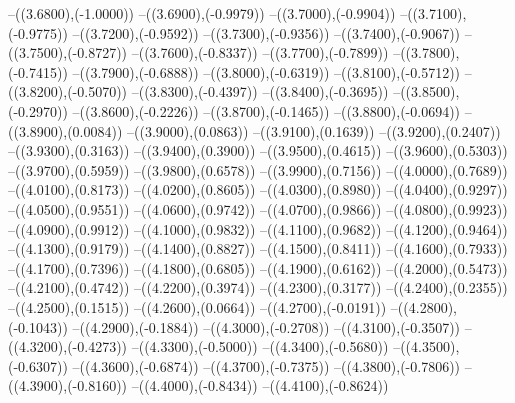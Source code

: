{	--({\sx*(3.6800)},{\sy*(-1.0000)})
	--({\sx*(3.6900)},{\sy*(-0.9979)})
	--({\sx*(3.7000)},{\sy*(-0.9904)})
	--({\sx*(3.7100)},{\sy*(-0.9775)})
	--({\sx*(3.7200)},{\sy*(-0.9592)})
	--({\sx*(3.7300)},{\sy*(-0.9356)})
	--({\sx*(3.7400)},{\sy*(-0.9067)})
	--({\sx*(3.7500)},{\sy*(-0.8727)})
	--({\sx*(3.7600)},{\sy*(-0.8337)})
	--({\sx*(3.7700)},{\sy*(-0.7899)})
	--({\sx*(3.7800)},{\sy*(-0.7415)})
	--({\sx*(3.7900)},{\sy*(-0.6888)})
	--({\sx*(3.8000)},{\sy*(-0.6319)})
	--({\sx*(3.8100)},{\sy*(-0.5712)})
	--({\sx*(3.8200)},{\sy*(-0.5070)})
	--({\sx*(3.8300)},{\sy*(-0.4397)})
	--({\sx*(3.8400)},{\sy*(-0.3695)})
	--({\sx*(3.8500)},{\sy*(-0.2970)})
	--({\sx*(3.8600)},{\sy*(-0.2226)})
	--({\sx*(3.8700)},{\sy*(-0.1465)})
	--({\sx*(3.8800)},{\sy*(-0.0694)})
	--({\sx*(3.8900)},{\sy*(0.0084)})
	--({\sx*(3.9000)},{\sy*(0.0863)})
	--({\sx*(3.9100)},{\sy*(0.1639)})
	--({\sx*(3.9200)},{\sy*(0.2407)})
	--({\sx*(3.9300)},{\sy*(0.3163)})
	--({\sx*(3.9400)},{\sy*(0.3900)})
	--({\sx*(3.9500)},{\sy*(0.4615)})
	--({\sx*(3.9600)},{\sy*(0.5303)})
	--({\sx*(3.9700)},{\sy*(0.5959)})
	--({\sx*(3.9800)},{\sy*(0.6578)})
	--({\sx*(3.9900)},{\sy*(0.7156)})
	--({\sx*(4.0000)},{\sy*(0.7689)})
	--({\sx*(4.0100)},{\sy*(0.8173)})
	--({\sx*(4.0200)},{\sy*(0.8605)})
	--({\sx*(4.0300)},{\sy*(0.8980)})
	--({\sx*(4.0400)},{\sy*(0.9297)})
	--({\sx*(4.0500)},{\sy*(0.9551)})
	--({\sx*(4.0600)},{\sy*(0.9742)})
	--({\sx*(4.0700)},{\sy*(0.9866)})
	--({\sx*(4.0800)},{\sy*(0.9923)})
	--({\sx*(4.0900)},{\sy*(0.9912)})
	--({\sx*(4.1000)},{\sy*(0.9832)})
	--({\sx*(4.1100)},{\sy*(0.9682)})
	--({\sx*(4.1200)},{\sy*(0.9464)})
	--({\sx*(4.1300)},{\sy*(0.9179)})
	--({\sx*(4.1400)},{\sy*(0.8827)})
	--({\sx*(4.1500)},{\sy*(0.8411)})
	--({\sx*(4.1600)},{\sy*(0.7933)})
	--({\sx*(4.1700)},{\sy*(0.7396)})
	--({\sx*(4.1800)},{\sy*(0.6805)})
	--({\sx*(4.1900)},{\sy*(0.6162)})
	--({\sx*(4.2000)},{\sy*(0.5473)})
	--({\sx*(4.2100)},{\sy*(0.4742)})
	--({\sx*(4.2200)},{\sy*(0.3974)})
	--({\sx*(4.2300)},{\sy*(0.3177)})
	--({\sx*(4.2400)},{\sy*(0.2355)})
	--({\sx*(4.2500)},{\sy*(0.1515)})
	--({\sx*(4.2600)},{\sy*(0.0664)})
	--({\sx*(4.2700)},{\sy*(-0.0191)})
	--({\sx*(4.2800)},{\sy*(-0.1043)})
	--({\sx*(4.2900)},{\sy*(-0.1884)})
	--({\sx*(4.3000)},{\sy*(-0.2708)})
	--({\sx*(4.3100)},{\sy*(-0.3507)})
	--({\sx*(4.3200)},{\sy*(-0.4273)})
	--({\sx*(4.3300)},{\sy*(-0.5000)})
	--({\sx*(4.3400)},{\sy*(-0.5680)})
	--({\sx*(4.3500)},{\sy*(-0.6307)})
	--({\sx*(4.3600)},{\sy*(-0.6874)})
	--({\sx*(4.3700)},{\sy*(-0.7375)})
	--({\sx*(4.3800)},{\sy*(-0.7806)})
	--({\sx*(4.3900)},{\sy*(-0.8160)})
	--({\sx*(4.4000)},{\sy*(-0.8434)})
	--({\sx*(4.4100)},{\sy*(-0.8624)})
}
